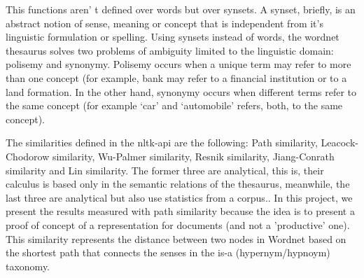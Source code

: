 \documentclass{pnastwo}
\newcommand\sq[1]{\textquoteleft #1\textquoteright}
\begin{document}
\begin{article}
This functions aren' t defined over words but over synsets. A synset, briefly, is an abstract notion of sense, meaning or concept that is independent from it's linguistic formulation or spelling. Using synsets instead of words, the wordnet thesaurus solves two problems of ambiguity limited to the linguistic domain: polisemy and synonymy. Polisemy occurs when a unique term may refer to more than one concept (for example, bank may refer to a financial institution or to a land formation. In the other hand, synonymy occurs when different terms refer to the same concept (for example \sq{car} and \sq{automobile} refers, both, to the same concept).

The similarities defined in the nltk-api are the following: Path similarity, Leacock-Chodorow similarity, Wu-Palmer similarity, Resnik similarity, Jiang-Conrath similarity and Lin similarity. The former three are analytical, this is, their calculus is based only in the semantic relations of the thesaurus, meanwhile, the last three are analytical but also use statistics from a corpus.\cite{BUDANITSKY}\cite{BUDANITSKY_2}. In this project, we present the results measured with path similarity because the idea is to present a proof of concept of a representation for documents (and not a 'productive' one). This similarity represents the distance between two nodes in Wordnet based on the shortest path that connects the senses in the is-a (hypernym/hypnoym) taxonomy.



\end{article}
\end{document}
